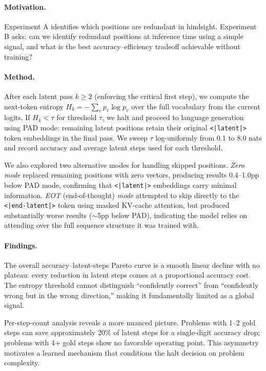 \documentclass{article}
\begin{document}
\paragraph{Motivation.} Experiment A identifies which positions are redundant in hindsight. Experiment B asks: can we identify redundant positions at inference time using a simple signal, and what is the best accuracy--efficiency tradeoff achievable without training?

\paragraph{Method.} After each latent pass $k \geq 2$ (enforcing the critical first step), we compute the next-token entropy $H_k = -\sum_v p_v \log p_v$ over the full vocabulary from the current logits. If $H_k < \tau$ for threshold $\tau$, we halt and proceed to language generation using PAD mode: remaining latent positions retain their original \texttt{<|latent|>} token embeddings in the final pass. We sweep $\tau$ log-uniformly from 0.1 to 8.0 nats and record accuracy and average latent steps used for each threshold.

We also explored two alternative modes for handling skipped positions. \textit{Zero mode} replaced remaining positions with zero vectors, producing results 0.4--1.0pp below PAD mode, confirming that \texttt{<|latent|>} embeddings carry minimal information. \textit{EOT} (end-of-thought) \textit{mode} attempted to skip directly to the \texttt{<|end-latent|>} token using masked KV-cache attention, but produced substantially worse results ($\sim$5pp below PAD), indicating the model relies on attending over the full sequence structure it was trained with.

\paragraph{Findings.} The overall accuracy--latent-steps Pareto curve is a smooth linear decline with no plateau: every reduction in latent steps comes at a proportional accuracy cost. The entropy threshold cannot distinguish ``confidently correct'' from ``confidently wrong but in the wrong direction,'' making it fundamentally limited as a global signal.

Per-step-count analysis reveals a more nuanced picture. Problems with 1--2 gold steps can save approximately 20\% of latent steps for a single-digit accuracy drop; problems with 4+ gold steps show no favorable operating point. This asymmetry motivates a learned mechanism that conditions the halt decision on problem complexity.
\end{document}
